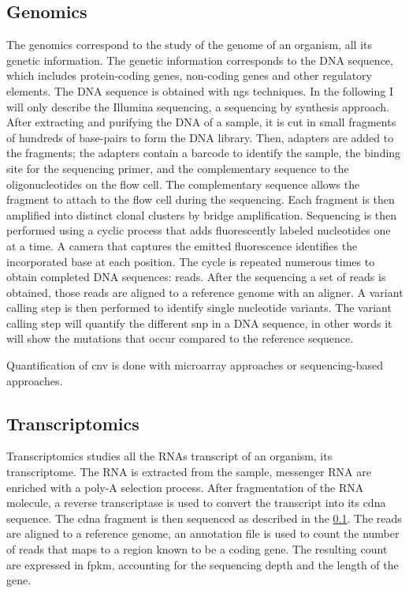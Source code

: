 \documentclass[../main.tex]{subfiles}
\begin{document}
 \subsection{Genomics}\label{subsec:genomics}
     The genomics correspond to the study of the genome of an organism, \ie all its genetic information.
     The genetic information corresponds to the DNA sequence, which includes protein-coding genes, non-coding genes and other regulatory elements.
     The DNA sequence is obtained with \gls{ngs} techniques.
     In the following I will only describe the Illumina sequencing, a sequencing by synthesis approach.
     After extracting and purifying the DNA of a sample, it is cut in small fragments of hundreds of base-pairs to form the DNA library.
     Then, adapters are added to the fragments; the adapters contain a barcode to identify the sample, the binding site for the sequencing primer, and the complementary sequence to the oligonucleotides on the flow cell.
     The complementary sequence allows the fragment to attach to the flow cell during the sequencing.
     Each fragment is then amplified into distinct clonal clusters by bridge amplification.
     Sequencing is then performed using a cyclic process that adds fluorescently labeled nucleotides one at a time.
     A camera that captures the emitted fluorescence identifies the incorporated base at each position.
     The cycle is repeated numerous times to obtain completed DNA sequences: reads.
     After the sequencing a set of reads is obtained, those reads are aligned to a reference genome with an aligner.
     A variant calling step is then performed to identify single nucleotide variants.
     The variant calling step will quantify the different \gls{snp} in a DNA sequence, in other words it will show the mutations that occur compared to the reference sequence.

     Quantification of \gls{cnv} is done with microarray approaches or sequencing-based approaches.

 \subsection{Transcriptomics}\label{subsec:transcriptomics}
     Transcriptomics studies all the RNAs transcript of an organism, \ie its transcriptome.
     The RNA is extracted from the sample, messenger RNA are enriched with a poly-A selection process.
     After fragmentation of the RNA molecule, a reverse transcriptase is used to convert the transcript into its \gls{cdna} sequence.
     The \gls{cdna} fragment is then sequenced as described in the \cref{subsec:genomics}.
     The reads are aligned to a reference genome, an annotation file is used to count the number of reads that maps to a region known to be a coding gene.
     The resulting count are expressed in \gls{fpkm}, accounting for the sequencing depth and the length of the gene.
\end{document}
